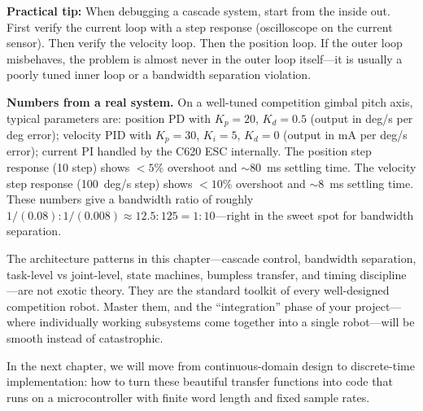 \begin{mdframed}[linewidth=1pt, innertopmargin=10pt, innerbottommargin=10pt]
\textbf{Practical tip:} When debugging a cascade system, start from the inside out. First verify the current loop with a step response (oscilloscope on the current sensor). Then verify the velocity loop. Then the position loop. If the outer loop misbehaves, the problem is almost never in the outer loop itself---it is usually a poorly tuned inner loop or a bandwidth separation violation.

\textbf{Numbers from a real system.} On a well-tuned competition gimbal pitch axis, typical parameters are: position PD with $K_p = 20$, $K_d = 0.5$ (output in deg/s per deg error); velocity PID with $K_p = 30$, $K_i = 5$, $K_d = 0$ (output in mA per deg/s error); current PI handled by the C620 ESC internally. The position step response (10\textdegree{} step) shows $<5\%$ overshoot and $\sim$80~ms settling time. The velocity step response (100~deg/s step) shows $<10\%$ overshoot and $\sim$8~ms settling time. These numbers give a bandwidth ratio of roughly $1/(0.08) : 1/(0.008) \approx 12.5 : 125 = 1 : 10$---right in the sweet spot for bandwidth separation.
\end{mdframed}

\vspace{0.5em}

The architecture patterns in this chapter---cascade control, bandwidth separation, task-level vs joint-level, state machines, bumpless transfer, and timing discipline---are not exotic theory. They are the standard toolkit of every well-designed competition robot. Master them, and the ``integration'' phase of your project---where individually working subsystems come together into a single robot---will be smooth instead of catastrophic.

In the next chapter, we will move from continuous-domain design to discrete-time implementation: how to turn these beautiful transfer functions into code that runs on a microcontroller with finite word length and fixed sample rates.
